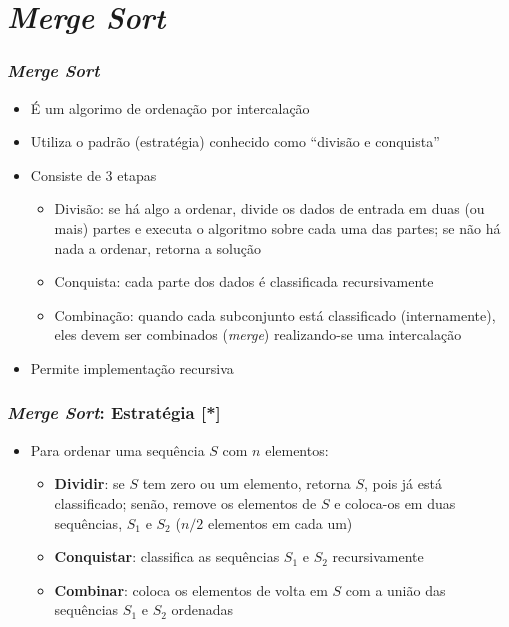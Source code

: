 \documentclass[aspectratio=169]{beamer}
\begin{document}
\section{\emph{Merge Sort}}

\begin{frame}\frametitle{\emph{Merge Sort}}
\begin{itemize}
	\item É um algorimo de ordenação por intercalação
	\item Utiliza o padrão (estratégia) conhecido como ``divisão e conquista''
	\item Consiste de 3 etapas
	\begin{itemize}
		\item Divisão: se há algo a ordenar, divide os dados de entrada em duas (ou mais) partes e executa o algoritmo sobre cada uma das partes; se não há nada a ordenar, retorna a solução
		\item Conquista: cada parte dos dados é classificada recursivamente
		\item Combinação: quando cada subconjunto está classificado (internamente), eles devem ser combinados (\emph{merge}) realizando-se uma intercalação
	\end{itemize}
	\item Permite implementação recursiva
\end{itemize}
\end{frame}

\begin{frame}\frametitle{\emph{Merge Sort}: Estratégia [*]}
\begin{itemize}
	\item  Para ordenar uma sequência $S$ com $n$ elementos:
	\begin{itemize}
		\item \textbf{Dividir}: se $S$ tem zero ou um elemento, retorna $S$, pois já está classificado; senão, remove os elementos de $S$ e coloca-os em duas sequências, $S_1$ e $S_2$ ($n/2$ elementos em cada um)
		\item \textbf{Conquistar}: classifica as sequências $S_1$ e $S_2$ recursivamente
		\item \textbf{Combinar}: coloca os elementos de volta em $S$ com a união das sequências $S_1$ e $S_2$ ordenadas
	\end{itemize}
	\end{itemize}
\end{frame}
\end{document}
